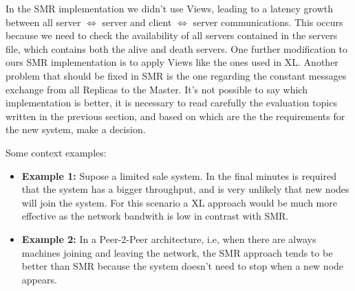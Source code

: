 \documentclass[times, 10pt,twocolumn]{article}
\begin{document}
In the SMR implementation we didn't use Views, leading to a latency growth between all server $\Leftrightarrow$ server and client $\Leftrightarrow$ server communications. 
This occurs because we need to check the availability of all servers contained in the servers file, which contains both the alive and death 
servers. One further modification to ours SMR implementation is to apply Views like the ones used in XL. 
Another problem that should be fixed in SMR is the one regarding the constant messages exchange from all Replicas to the Master.
It's not possible to say which implementation is better, it is necessary to read carefully the evaluation topics written in the previous section,
and based on which are the the requirements for the new system, make a decision.


Some context examples:
\begin{itemize}
   \item \textbf{Example 1:} Supose a limited sale system. In the final minutes
   is required that the system has a bigger throughput, and is very unlikely
   that new nodes will join the system. For this scenario a XL approach would
   be much more effective as the network bandwith is low in contrast with SMR.
   \item \textbf{Example 2:} In a Peer-2-Peer architecture, i.e, when there are always
   machines joining and leaving the network, the SMR approach tends to be better than
   SMR because the system doesn't need to stop when a new node appears.
\end{itemize}

\nocite{ex1,ex2}


\end{document}
